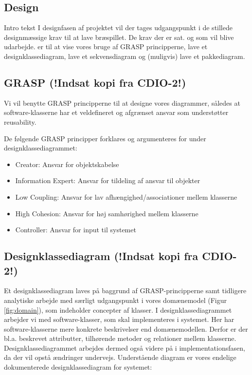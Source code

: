 \documentclass[../main.tex]{subfiles}
\begin{document}
\begin{flushleft} 
\section{Design}

\TODO Intro tekst
I designfasen af projektet vil der tages udgangspunkt i de stillede designmæssige krav til at lave bræspillet. De krav der er sat. og som vil blive udarbejde. er til at vise vores bruge af GRASP principperne, lave et designklassediagram, lave et sekvensdiagram og (muligvis) lave et pakkediagram. 


\subsection{GRASP (!Indsat kopi fra CDIO-2!)}

Vi vil benytte GRASP principperne til at designe vores diagrammer, således at software-klasserne har et veldefineret og afgrænset ansvar som understøtter reusability. \newline

\vspace{5mm}
De følgende GRASP principper forklares og argumenteres for under designklassediagrammet:
\begin{itemize}
    \item Creator: Ansvar for objektskabelse
    \item Information Expert: Ansvar for tildeling af ansvar til objekter
    \item Low Coupling: Ansvar for lav afhængighed/associationer mellem klasserne
    \item High Cohesion: Ansvar for høj samhørighed mellem klasserne
    \item Controller: Ansvar for input til systemet
\end{itemize}



\subsection{Designklassediagram (!Indsat kopi fra CDIO-2!)}

Et designklassediagram laves på baggrund af GRASP-principperne samt tidligere analytiske arbejde med særligt udgangspunkt i  vores domænemodel (Figur \ref{fig:domain}), som indeholder concepter af klasser. I designklassediagrammet arbejder vi med software-klasser, som skal implementeres i systemet. Her har software-klasserne mere konkrete beskrivelser end domænemodellen. Derfor er der bl.a. beskrevet attributter, tilhørende metoder og relationer mellem klasserne. Designklassediagrammet arbejdes dermed også videre på i implementationsfasen, da der vil opstå ændringer undervejs. Understående diagram er vores endelige dokumenterede designklassediagram for systemet:



\end{flushleft}
\end{document}
